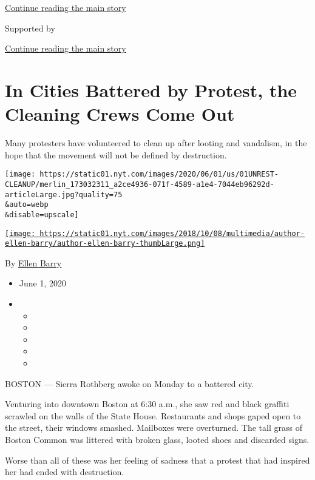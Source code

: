 \protect\hyperlink{after-top}{Continue reading the main story}

Supported by

\protect\hyperlink{after-sponsor}{Continue reading the main story}

\hypertarget{in-cities-battered-by-protest-the-cleaning-crews-come-out}{%
\section{In Cities Battered by Protest, the Cleaning Crews Come
Out}\label{in-cities-battered-by-protest-the-cleaning-crews-come-out}}

Many protesters have volunteered to clean up after looting and
vandalism, in the hope that the movement will not be defined by
destruction.

\texttt{[image: https://static01.nyt.com/images/2020/06/01/us/01UNREST-CLEANUP/merlin\_173032311\_a2ce4936-071f-4589-a1e4-7044eb96292d-articleLarge.jpg?quality=75\\\&auto=webp\\\&disable=upscale]}

\href{https://www.nytimes.com/by/ellen-barry}{\texttt{[image: https://static01.nyt.com/images/2018/10/08/multimedia/author-ellen-barry/author-ellen-barry-thumbLarge.png]}}

By \href{https://www.nytimes.com/by/ellen-barry}{Ellen Barry}

\begin{itemize}
\item
  June 1, 2020
\item
  \begin{itemize}
  \item
  \item
  \item
  \item
  \item
  \end{itemize}
\end{itemize}

BOSTON --- Sierra Rothberg awoke on Monday to a battered city.

Venturing into downtown Boston at 6:30 a.m., she saw red and black
graffiti scrawled on the walls of the State House. Restaurants and shops
gaped open to the street, their windows smashed. Mailboxes were
overturned. The tall grass of Boston Common was littered with broken
glass, looted shoes and discarded signs.

Worse than all of these was her feeling of sadness that a protest that
had inspired her had ended with destruction.

